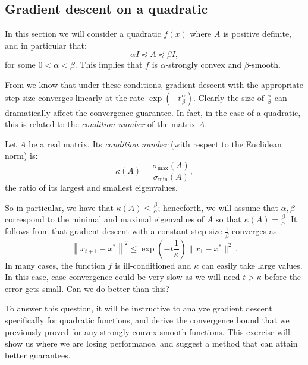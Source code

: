 \subsection{Gradient descent on a quadratic}
In this section we will consider a quadratic $f(x)$ where $A$ is positive definite, and in particular that:
\begin{equation*}
\alpha I \preceq A \preceq \beta I,
\end{equation*}
for some $0 < \alpha < \beta$. This implies that $f$ is $\alpha$-strongly convex and $\beta$-smooth. 

From  we know that under these conditions, gradient descent with the appropriate step size converges linearly at the rate $\exp\left(-t \frac{\alpha}{\beta}\right)$. Clearly the size of $\frac{\alpha}{\beta}$ can dramatically affect the convergence guarantee. In fact, in the case of a quadratic, this is related to the \textit{condition number} of the matrix $A$.

\begin{definition}
Let $A$ be a real matrix. Its \textit{condition number} (with respect to the Euclidean norm) is:
\begin{equation*}
\kappa(A) = \frac{\sigma_{\max}(A)}{\sigma_{\min}(A)},
\end{equation*}
the ratio of its largest and smallest eigenvalues.
\end{definition}

So in particular, we have that $\kappa(A) \leq \frac{\beta}{\alpha}$;
henceforth, we will assume that $\alpha, \beta$ correspond to the minimal and
maximal eigenvalues of $A$ so that $\kappa(A) = \frac{\beta}{\alpha}$. It
follows from  
that gradient descent with a constant step size $\frac{1}{\beta}$
converges as
\begin{equation*}
\left\|x_{t+1} - x^*\right\|^2 
\leq \exp{\left(-t \frac{1}{\kappa}\right)}\|x_1 - x^*\|^2\,.
\end{equation*}
In many cases, the function $f$ is ill-conditioned and $\kappa$ can easily take
large values. In this case, case convergence could be
very slow as we will need $t > \kappa$ before the error gets small.
Can we do better than this?

To answer this question, it will be instructive to analyze gradient descent
specifically for quadratic functions, and derive the convergence bound that we
previously proved for any strongly convex smooth functions. This exercise will
show us where we are losing performance, and suggest a method that can attain
better guarantees.

